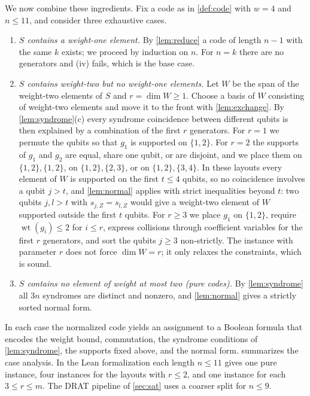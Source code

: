 \documentclass[a4paper,onecolumn,unpublished]{quantumarticle}
\theoremstyle{definition}
\theoremstyle{remark}
\newcommand{\wt}{\operatorname{wt}}
\begin{document}
We now combine these ingredients. Fix a code as in \cref{def:code} with $w=4$ and $n\le11$, and
consider three exhaustive cases.
\begin{enumerate}
\item[(A)] \emph{$S$ contains a weight-one element.} By \cref{lem:reduce} a code of length $n-1$
with the same $k$ exists; we proceed by induction on $n$. For $n=k$ there are no generators and
(iv) fails, which is the base case.
\item[(B)] \emph{$S$ contains weight-two but no weight-one elements.} Let $W$ be the span of the
weight-two elements of $S$ and $r=\dim W\ge1$. Choose a basis of $W$ consisting of weight-two
elements and move it to the front with \cref{lem:exchange}. By \cref{lem:syndrome}(c) every
syndrome coincidence between different qubits is then explained by a combination of the first $r$
generators. For $r=1$ we permute the qubits so that $g_1$ is supported on $\{1,2\}$. For $r=2$ the
supports of $g_1$ and $g_2$ are equal, share one qubit, or are disjoint, and we place them on
$\{1,2\},\{1,2\}$, on $\{1,2\},\{2,3\}$, or on $\{1,2\},\{3,4\}$. In these layouts every element of
$W$ is supported on the first $t\le4$ qubits, so no coincidence involves a qubit $j>t$, and
\cref{lem:normal} applies with strict inequalities beyond $t$: two qubits $j,l>t$ with
$s_{j,Z}=s_{l,Z}$ would give a weight-two element of $W$ supported outside the first $t$ qubits.
For $r\ge3$ we place $g_1$ on $\{1,2\}$, require $\wt(g_i)\le2$ for $i\le r$, express collisions
through coefficient variables for the first $r$ generators, and sort the qubits $j\ge3$
non-strictly. The instance with parameter $r$ does not force $\dim W=r$; it only relaxes the
constraints, which is sound.
\item[(C)] \emph{$S$ contains no element of weight at most two (pure codes).} By
\cref{lem:syndrome} all $3n$ syndromes are distinct and nonzero, and \cref{lem:normal} gives a
strictly sorted normal form.
\end{enumerate}
In each case the normalized code yields an assignment to a Boolean formula that encodes the
weight bound, commutation, the syndrome conditions of \cref{lem:syndrome}, the supports fixed
above, and the normal form.  summarizes the case analysis. In the Lean
formalization each length $n\le11$ gives one pure instance, four instances for the layouts with
$r\le2$, and one instance for each $3\le r\le m$. The DRAT pipeline of \cref{sec:sat} uses a
coarser split for $n\le9$.
\end{document}
